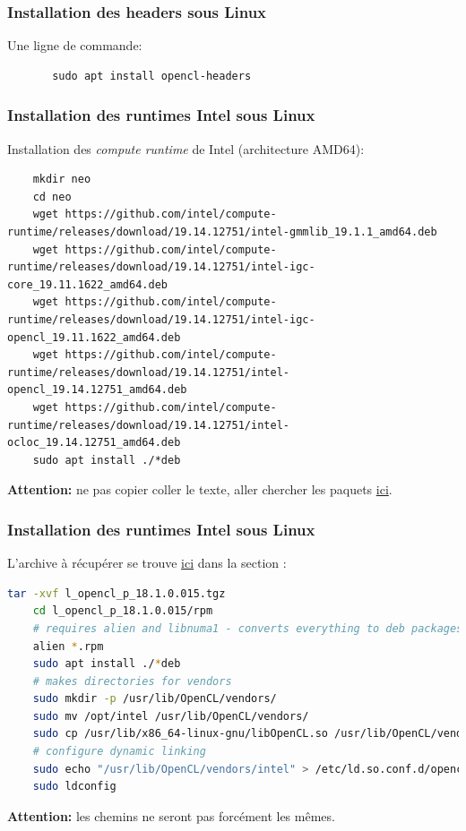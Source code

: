 \documentclass[8pt]{beamer}
\begin{document}
\begin{frame}[fragile]
    \frametitle{Installation des headers sous Linux}
    Une ligne de commande:
    \begin{lstlisting}
       sudo apt install opencl-headers 
    \end{lstlisting}
\end{frame}


\begin{frame}[fragile]
    \frametitle{Installation des runtimes Intel sous Linux}
    Installation des \textit{compute runtime} de Intel (architecture AMD64):
    \begin{lstlisting}
    mkdir neo
    cd neo
    wget https://github.com/intel/compute-runtime/releases/download/19.14.12751/intel-gmmlib_19.1.1_amd64.deb
    wget https://github.com/intel/compute-runtime/releases/download/19.14.12751/intel-igc-core_19.11.1622_amd64.deb
    wget https://github.com/intel/compute-runtime/releases/download/19.14.12751/intel-igc-opencl_19.11.1622_amd64.deb
    wget https://github.com/intel/compute-runtime/releases/download/19.14.12751/intel-opencl_19.14.12751_amd64.deb
    wget https://github.com/intel/compute-runtime/releases/download/19.14.12751/intel-ocloc_19.14.12751_amd64.deb
    sudo apt install ./*deb
    \end{lstlisting}
    \vspace{20pt}
    \textbf{Attention:} ne pas copier coller le texte, aller chercher les 
    paquets \href{https://github.com/intel/compute-runtime/releases}{ici}.
\end{frame}

\begin{frame}[fragile]
    \frametitle{Installation des runtimes Intel sous Linux}
    L'archive à récupérer se trouve 
    \href{https://software.intel.com/content/www/us/en/develop/articles/opencl-drivers.html}{ici} 
    dans la section :
    \begin{lstlisting}[language=sh]
    tar -xvf l_opencl_p_18.1.0.015.tgz
    cd l_opencl_p_18.1.0.015/rpm
    # requires alien and libnuma1 - converts everything to deb packages
    alien *.rpm
    sudo apt install ./*deb
    # makes directories for vendors
    sudo mkdir -p /usr/lib/OpenCL/vendors/
    sudo mv /opt/intel /usr/lib/OpenCL/vendors/
    sudo cp /usr/lib/x86_64-linux-gnu/libOpenCL.so /usr/lib/OpenCL/vendors/intel/libOpenCL.so
    # configure dynamic linking
    sudo echo "/usr/lib/OpenCL/vendors/intel" > /etc/ld.so.conf.d/opencl-vendor-intel.conf
    sudo ldconfig
    \end{lstlisting}
    \vspace{20pt}
    \textbf{Attention:} les chemins ne seront pas forcément les mêmes.
\end{frame}
\end{document}
